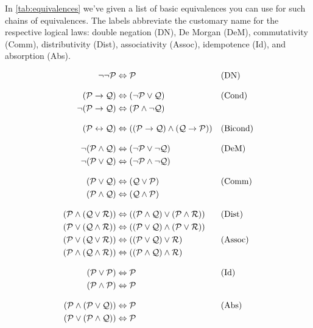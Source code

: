 In \cref{tab:equivalences} we've given a list of basic equivalences you can use for such chains of equivalences. The labels abbreviate the customary name for the respective logical laws: double negation (DN), De Morgan (DeM), commutativity (Comm), distributivity (Dist), associativity (Assoc), idempotence (Id), and absorption (Abs).

\begin{table}
	\begin{align*}
\lnot\lnot \metav{P} & \Leftrightarrow \metav{P} && \text{(DN)}\\[2ex]
(\metav{P} \eif \metav{Q}) & \Leftrightarrow (\lnot \metav{P} \lor \metav{Q})
&& \text{(Cond)}\\
\lnot(\metav{P} \eif \metav{Q}) & \Leftrightarrow (\metav{P} \land \lnot\metav{Q}) \\[2ex]
(\metav{P} \eiff \metav{Q}) & \Leftrightarrow ((\metav{P} \eif \metav{Q}) \land  (\metav{Q} \eif \metav{P}))
&& \text{(Bicond)}\\[2ex]
\lnot(\metav{P} \land \metav{Q}) & \Leftrightarrow (\lnot\metav{P} \lor \lnot\metav{Q})
&& \text{(DeM)}\\
\lnot(\metav{P} \lor \metav{Q}) & \Leftrightarrow (\lnot\metav{P} \land \lnot\metav{Q}) \\[2ex]
(\metav{P} \lor \metav{Q}) & \Leftrightarrow (\metav{Q} \lor \metav{P}) & &\text{(Comm)}\\
(\metav{P} \land \metav{Q}) & \Leftrightarrow (\metav{Q} \land \metav{P})\\[2ex]
(\metav{P} \land (\metav{Q} \lor \metav{R})) & \Leftrightarrow ((\metav{P} \land \metav{Q}) \lor (\metav{P} \land \metav{R}))
&& \text{(Dist)}\\
(\metav{P} \lor (\metav{Q} \land \metav{R})) & \Leftrightarrow ((\metav{P} \lor \metav{Q}) \land (\metav{P} \lor \metav{R}))\\
(\metav{P} \lor (\metav{Q} \lor \metav{R})) & \Leftrightarrow ((\metav{P} \lor \metav{Q}) \lor \metav{R}) & &\text{(Assoc)}\\
(\metav{P} \land (\metav{Q} \land \metav{R})) & \Leftrightarrow ((\metav{P} \land \metav{Q}) \land \metav{R})\\[2ex]
(\metav{P} \lor \metav{P}) & \Leftrightarrow \metav{P} && \text{(Id)}\\
(\metav{P} \land \metav{P}) & \Leftrightarrow \metav{P}\\[2ex]
(\metav{P} \land (\metav{P} \lor \metav{Q})) & \Leftrightarrow \metav{P}&& \text{(Abs)}\\
(\metav{P} \lor (\metav{P} \land \metav{Q})) & \Leftrightarrow \metav{P}\\[2ex]

\end{align*}
\end{table}
